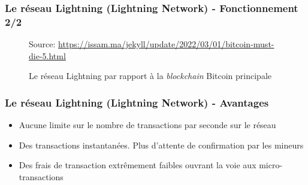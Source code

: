 \begin{frame}
	\frametitle{Le réseau Lightning (Lightning Network) - Fonctionnement 2/2}
	\begin{figure}[h!]
		{\scriptsize Source: \url{https://issam.ma/jekyll/update/2022/03/01/bitcoin-must-die-5.html}}

		\caption{Le réseau Lightning par rapport à la \textit{blockchain} Bitcoin principale}

	\end{figure}

\end{frame}

\begin{frame}
	\frametitle{Le réseau Lightning (Lightning Network) - Avantages}
	\begin{itemize}
		\item Aucune limite sur le nombre de transactions par seconde sur le réseau
		      \newline
		\item Des transactions instantanées. Plus d’attente de confirmation par les mineurs
		      \newline
		\item Des frais de transaction extrêmement faibles ouvrant la voie aux micro-transactions
	\end{itemize}
\end{frame}

